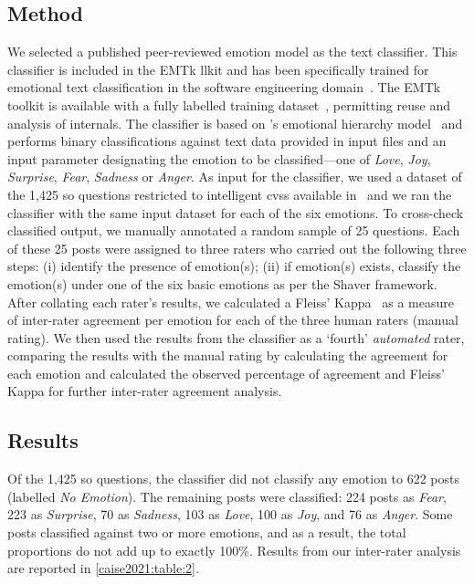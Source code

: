 \subsection{Method}
\label{caise2021:sec:study:method}
We selected a published peer-reviewed emotion model as the text classifier. This classifier is included in the EMTk llkit and has been specifically trained for emotional text classification in the software engineering domain~\citep{calefato2017}. The EMTk toolkit is available with a fully labelled training dataset~\citep{novielli2018}, permitting reuse and analysis of internals.  The classifier is based on \citeauthor{shaver1987}'s emotional hierarchy model~\citep{shaver1987} and performs binary classifications against text data provided in input files and an input parameter designating the emotion to be classified---one of \textit{Love}, \textit{Joy}, \textit{Surprise}, \textit{Fear}, \textit{Sadness} or \textit{Anger}. As input for the classifier, we used a dataset of the 1,425 \gls{so} questions restricted to intelligent \glspl{cvs} available in~\citep{Cummaudo:2020icse} and we ran the classifier with the same input dataset for each of the six emotions.
To cross-check classified output, we manually annotated a random sample of 25 questions.  Each of these 25 posts were assigned to three raters who carried out the following three steps: (i) identify the presence of emotion(s); (ii) if emotion(s) exists, classify the emotion(s) under one of the six basic emotions as per the Shaver framework. After collating each rater's results, we calculated a Fleiss' Kappa~\citep{Fleiss:1971ff} as a measure of inter-rater agreement per emotion for each of the three human raters (manual rating). We then used the results from the classifier as a `fourth' \textit{automated} rater, comparing the results with the manual rating by calculating the agreement for each emotion and calculated the observed percentage of agreement and Fleiss' Kappa for further inter-rater agreement analysis.

\subsection{Results} \label{caise2021:SubSection:Findings}

Of the 1,425 \gls{so} questions, the classifier did not classify any emotion to 622 posts (labelled \textit{No Emotion}). The remaining posts were classified: 224 posts as \textit{Fear}, 223 as \textit{Surprise}, 70 as \textit{Sadness}, 103 as \textit{Love}, 100 as \textit{Joy}, and 76 as \textit{Anger}. Some posts classified against two or more emotions, and as a result, the total proportions do not add up to exactly 100\%. 
Results from our inter-rater analysis are reported in \cref{caise2021:table:2}.


